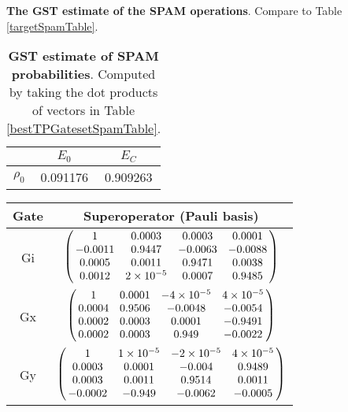 {\begin{table}[h]
\begin{center}
\caption{\textbf{The GST estimate of the SPAM operations}.  Compare to Table \ref{targetSpamTable}.\label{bestTPGatesetSpamTable}}
\end{center}
\end{table}

\begin{table}[h]
\begin{center}
\begin{tabular}[l]{|c|c|c|}
\hline
 & $E_{0}$ & $E_C$ \\ \hline
$\rho_{0}$ & 0.091176 & 0.909263 \\ \hline
\end{tabular}

\caption{\textbf{GST estimate of SPAM probabilities}.  Computed by taking the dot products of vectors in Table \ref{bestTPGatesetSpamTable}.\label{bestTPGatesetSpamParametersTable}}
\end{center}
\end{table}

\begin{table}[h]
\begin{center}
\begin{tabular}[l]{|c|c|}
\hline
Gate & Superoperator (Pauli basis) \\ \hline
Gi & $ \left(\!\!\begin{array}{cccc}
1 & 0.0003 & 0.0003 & 0.0001 \\ 
-0.0011 & 0.9447 & -0.0063 & -0.0088 \\ 
0.0005 & 0.0011 & 0.9471 & 0.0038 \\ 
0.0012 & 2\times 10^{-5} & 0.0007 & 0.9485
 \end{array}\!\!\right) $
 \\ \hline
Gx & $ \left(\!\!\begin{array}{cccc}
1 & 0.0001 & -4\times 10^{-5} & 4\times 10^{-5} \\ 
0.0004 & 0.9506 & -0.0048 & -0.0054 \\ 
0.0002 & 0.0003 & 0.0001 & -0.9491 \\ 
0.0002 & 0.0003 & 0.949 & -0.0022
 \end{array}\!\!\right) $
 \\ \hline
Gy & $ \left(\!\!\begin{array}{cccc}
1 & 1\times 10^{-5} & -2\times 10^{-5} & 4\times 10^{-5} \\ 
0.0003 & 0.0001 & -0.004 & 0.9489 \\ 
0.0003 & 0.0011 & 0.9514 & 0.0011 \\ 
-0.0002 & -0.949 & -0.0062 & -0.0005
 \end{array}\!\!\right) $
 \\ \hline
\end{tabular}


\end{center}
\end{table}}
